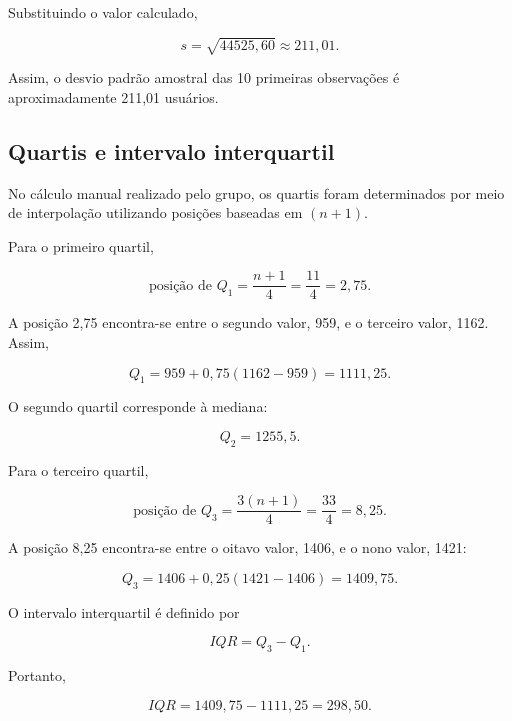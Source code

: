 \documentclass[12pt,a4paper]{article}
\begin{document}
Substituindo o valor calculado,

\begin{equation}
s =
\sqrt{44525{,}60}
\approx
211{,}01.
\end{equation}

Assim, o desvio padrão amostral das 10 primeiras observações é aproximadamente
211,01 usuários.

\subsection{Quartis e intervalo interquartil}

No cálculo manual realizado pelo grupo, os quartis foram determinados por meio
de interpolação utilizando posições baseadas em $(n+1)$.

Para o primeiro quartil,

\begin{equation}
\text{posição de }Q_1 =
\frac{n+1}{4}
=
\frac{11}{4}
=
2{,}75.
\end{equation}

A posição 2,75 encontra-se entre o segundo valor, 959, e o terceiro valor, 1162.
Assim,

\begin{equation}
Q_1 =
959 + 0{,}75(1162-959)
=
1111{,}25.
\end{equation}

O segundo quartil corresponde à mediana:

\begin{equation}
Q_2 = 1255{,}5.
\end{equation}

Para o terceiro quartil,

\begin{equation}
\text{posição de }Q_3 =
\frac{3(n+1)}{4}
=
\frac{33}{4}
=
8{,}25.
\end{equation}

A posição 8,25 encontra-se entre o oitavo valor, 1406, e o nono valor, 1421:

\begin{equation}
Q_3 =
1406 + 0{,}25(1421-1406)
=
1409{,}75.
\end{equation}

O intervalo interquartil é definido por

\begin{equation}
IQR = Q_3-Q_1.
\end{equation}

Portanto,

\begin{equation}
IQR =
1409{,}75-1111{,}25
=
298{,}50.
\end{equation}
\end{document}
